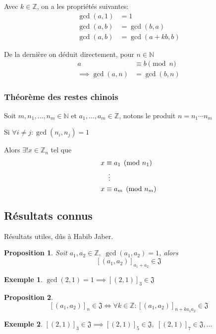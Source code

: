 \documentclass{article}
\newtheorem{proposition}{Proposition}
\newtheorem{exemple}{Exemple}
\begin{document}
Avec $k \in \mathbb{Z}$, on a les propriétés suivantes:
\begin{align}
\gcd(a, 1) & = 1 \\
\gcd(a, b) & = \gcd(b, a) \\
\gcd(a, b) & = \gcd(a + kb, b)
\end{align}

De la dernière on déduit directement, pour $n \in \mathbb{N}$
\begin{align*}
    a &\equiv b \pmod n \\ \implies \gcd(a, n) &= \gcd(b, n)
\end{align*}

\subsubsection{Théorème des restes chinois}

Soit $m, n_1, \dots, n_m \in \mathbb{N}$ et $a_1, \dots, a_m \in \mathbb{Z}$, notons le produit $n = n_1 \cdots n_m$

Si $\forall i \neq j : \gcd(n_i, n_j) = 1$

Alors $\exists!x \in \mathbb{Z}_n$ tel que
\begin{align*}
    x &\equiv a_1 \pmod {n_1} \\
    &\vdotswithin{\equiv} \\
    x &\equiv a_m \pmod {n_m}
\end{align*}


\subsection{Résultats connus}
Résultats utiles, dûs à Habib Jaber.

\begin{proposition}
    Soit $a_1, a_2 \in \mathbb{Z},\; \gcd(a_1, a_2) = 1$, alors
    \[ {[(a_1, a_2)]}_{a_1+a_2} \in \mathfrak{J} \]
\end{proposition}

\begin{exemple}
    $\gcd(2, 1) = 1 \implies {[(2, 1)]}_3 \in \mathfrak{J}$
\end{exemple}

\begin{proposition}
    \[ 
    [(a_1, a_2)]_n \in \mathfrak{J} \iff 
    \forall k \in \mathbb{Z}: {[(a_1, a_2)]}_{n+ka_1a_2} \in \mathfrak{J} 
    \]
\end{proposition}

\begin{exemple}
    $[(2, 1)]_3 \in \mathfrak{J} \implies {[(2, 1)]}_5 \in \mathfrak{J},\; {[(2, 1)]}_7 \in \mathfrak{J}, \dots$
\end{exemple}
\end{document}
